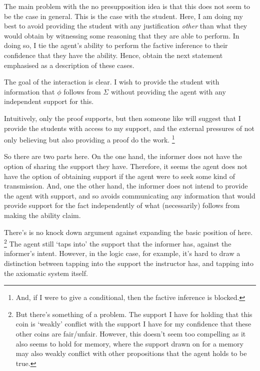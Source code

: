 \documentclass[10pt]{article}
\begin{document}
\begin{note}[Student]
  The main problem with the no presupposition idea is that this does not seem to be the case in general.
  This is the case with the student.
  Here, I am doing my best to avoid providing the student with any justification \emph{other} than what they would obtain by witnessing some reasoning that they are able to perform.
  In doing so, I tie the agent's ability to perform the factive inference to their confidence that they have the ability.
  Hence, obtain the next statement emphasised as a description of these cases.
\end{note}

The goal of the interaction is clear.
I wish to provide the student with information that \(\phi\) follows from \(\Sigma\) without providing the agent with any independent support for this.

Intuitively, only the proof supports, but then someone like \citeauthor{Owens:2006tw} will suggest that I provide the students with access to my support, and the external pressures of not only believing but also providing a proof do the work.\nolinebreak
\footnote{
  And, if I were to give a conditional, then the factive inference is blocked.
}

So there are two parts here.
On the one hand, the informer does not have the option of sharing the support they have.
Therefore, it seems the agent does not have the option of obtaining support if the agent were to seek some kind of transmission.
And, one the other hand, the informer does not intend to provide the agent with support, and so avoids communicating any information that would provide support for the fact independently of what (necessarily) follows from making the ability claim.

There's is no knock down argument against expanding the basic position of \citeauthor{Owens:2006tw} here.\nolinebreak
\footnote{
But there's something of a problem.
The support I have for holding that this coin is `weakly' conflict with the support I have for my confidence that these other coins are fair/unfair.
However, this doesn't seem too compelling as it also seems to hold for memory, where the support drawn on for a memory may also weakly conflict with other propositions that the agent holds to be true.
}
The agent still `taps into' the support that the informer has, against the informer's intent.
However, in the logic case, for example, it's hard to draw a distinction between tapping into the support the instructor has, and tapping into the axiomatic system itself.
\end{document}
